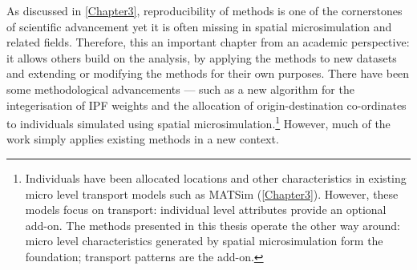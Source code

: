 As discussed in \cref{Chapter3}, reproducibility of methods is one of the
cornerstones
of scientific advancement yet it is often missing in spatial microsimulation and
related fields. Therefore, this an important chapter from an academic perspective:
it allows others build on the analysis, by applying the methods to new datasets
and extending or modifying the methods for their own purposes. 
There have been some methodological advancements ---
such as a new algorithm for the integerisation of IPF weights and
the allocation of origin-destination co-ordinates to individuals
simulated using spatial
microsimulation.\footnote{Individuals
have been allocated locations and other characteristics in
existing micro level transport models such as
MATSim (\cref{Chapter3}). However, these models focus on transport:
individual level attributes provide an optional add-on.
The methods presented in this thesis operate the other
way around: micro level characteristics generated by spatial microsimulation
form the foundation; transport patterns are the add-on.
}
However, much of the work simply applies existing methods in a
new context.

